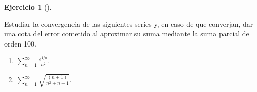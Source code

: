 \documentclass[
  spanish,
  a4paper,
]{scrreport}
\providecommand{\tightlist}{%
  \setlength{\itemsep}{0pt}\setlength{\parskip}{0pt}}
\theoremstyle{definition}
\newtheorem{exercise}{Ejercicio}[chapter]
\theoremstyle{remark}
\begin{document}
\begin{exercise}[]\protect\hypertarget{exr-5}{}\label{exr-5}

Estudiar la convergencia de las siguientes series y, en caso de que
converjan, dar una cota del error cometido al aproximar su suma mediante
la suma parcial de orden 100.

\begin{enumerate}
\def\labelenumi{\alph{enumi}.}
\tightlist
\item
  \(\displaystyle \sum_{n=1}^\infty \frac{e^{1/n}}{n^2}\).
\item
  \(\displaystyle \sum_{n=1}^\infty \sqrt{\frac{(n+1)}{n^2+n-1}}\).
\end{enumerate}

\end{exercise}
\end{document}
